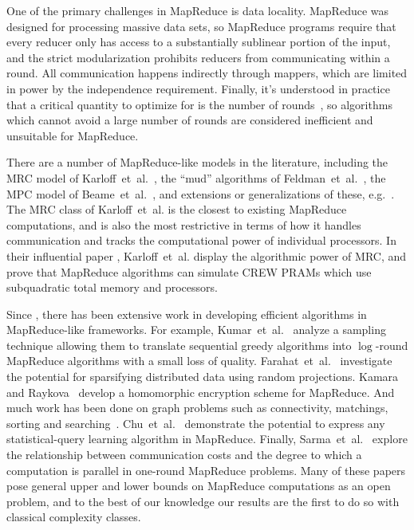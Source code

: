 \documentclass[11pt]{article}
\theoremstyle{definition}
\theoremstyle{remark}
\begin{document}
One of the primary challenges in MapReduce is data locality. MapReduce was
designed for processing massive data sets, so MapReduce programs require that
every reducer only has access to a substantially sublinear portion of the
input, and the strict modularization prohibits reducers from communicating
within a round. All communication happens indirectly through mappers, which are
limited in power by the independence requirement. Finally, it's understood in
practice that a critical quantity to optimize for is the number of
rounds~\cite{Karloff10}, so algorithms which cannot avoid a large number of
rounds are considered inefficient and unsuitable for MapReduce.

There are a number of MapReduce-like models in the literature, including the
MRC model of Karloff~et~al.~\cite{Karloff10}, the ``mud'' algorithms of
Feldman~et~al.~\cite{FeldmanMSSS10}, the MPC model of
Beame~et~al.~\cite{BeameKS13}, and extensions or generalizations of these,
e.g.~\cite{GoodrichSZ11}. The MRC class of Karloff~et~al. is the closest to
existing MapReduce computations, and is also the most restrictive in terms of
how it handles communication and tracks the computational power of individual
processors. In their influential paper \cite{Karloff10}, Karloff~et~al. display
the algorithmic power of MRC, and prove that MapReduce algorithms can simulate
CREW PRAMs which use subquadratic total memory and processors.

Since \cite{Karloff10}, there has been extensive work in developing efficient
algorithms in MapReduce-like frameworks. For example,
Kumar~et~al.~\cite{KMVV13} analyze a sampling technique allowing them to
translate sequential greedy algorithms into $\log$-round MapReduce algorithms
with a small loss of quality.  Farahat~et~al.~\cite{FEGK13} investigate the
potential for sparsifying distributed data using random projections. Kamara and
Raykova~\cite{KR13} develop a homomorphic encryption scheme for MapReduce. And
much work has been done on graph problems such as connectivity, matchings,
sorting and searching~\cite{GoodrichSZ11}. Chu~et~al.~\cite{ChuKLYBNO06}
demonstrate the potential to express any statistical-query learning algorithm
in MapReduce.  Finally, Sarma~et~al.~\cite{Sarma13} explore the relationship
between communication costs and the degree to which a computation is parallel
in one-round MapReduce problems. Many of these papers pose general upper and
lower bounds on MapReduce computations as an open problem, and to the best of
our knowledge our results are the first to do so with classical complexity
classes.
\end{document}
